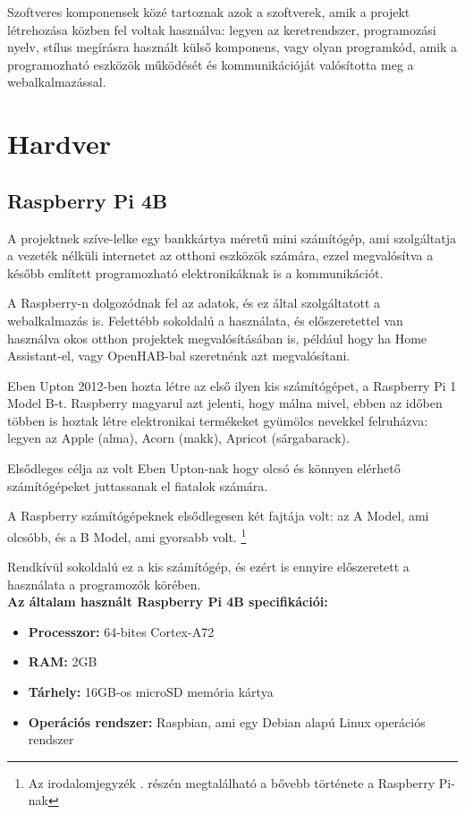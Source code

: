 \documentclass[
]{thesis-ekf}
\theoremstyle{definition}
\theoremstyle{remark}
\begin{document}
	Szoftveres komponensek közé tartoznak azok a szoftverek, amik a projekt létrehozása közben fel voltak használva: legyen az keretrendszer, programozási nyelv, stílus megírásra használt külső komponens, vagy olyan programkód, amik a programozható eszközök működését és kommunikációját valósította meg a webalkalmazással.
	
	\section{Hardver}
	\subsection{Raspberry Pi 4B}
	A projektnek szíve-lelke egy bankkártya méretű mini számítógép, ami szolgáltatja a vezeték nélküli internetet az otthoni eszközök számára, ezzel megvalósítva a később említett programozható elektronikáknak is a kommunikációt.
	
	A Raspberry-n dolgozódnak fel az adatok, és ez által szolgáltatott a webalkalmazás is. Felettébb sokoldalú a használata, és előszeretettel van használva okos otthon projektek megvalósításában is, például hogy ha Home Assistant-el, vagy OpenHAB-bal szeretnénk azt megvalósítani.
	
	Eben Upton 2012-ben hozta létre az első ilyen kis számítógépet, a Raspberry Pi 1 Model B-t. Raspberry magyarul azt jelenti, hogy málna mivel, ebben az időben többen is hoztak létre elektronikai termékeket gyümölcs nevekkel felruházva: legyen az Apple (alma), Acorn (makk), Apricot (sárgabarack).
	
	Elsődleges célja az volt Eben Upton-nak hogy olcsó és könnyen elérhető számítógépeket juttassanak el fiatalok számára.
	
	A Raspberry számítógépeknek elsődlegesen két fajtája volt: az A Model, ami olcsóbb, és a B Model, ami gyorsabb volt. \footnote{Az irodalomjegyzék \cite{raspberrypi-history}. részén megtalálható a bővebb története a Raspberry Pi-nak}
	
	Rendkívül sokoldalú ez a kis számítógép, és ezért is ennyire előszeretett a használata a programozók körében.\\
	\textbf{Az általam használt Raspberry Pi 4B specifikációi:}
	\begin{itemize}
		\item \textbf{Processzor:} 64-bites Cortex-A72
		\item \textbf{RAM:} 2GB
		\item \textbf{Tárhely:} 16GB-os microSD memória kártya
		\item \textbf{Operációs rendszer:} Raspbian, ami egy Debian alapú Linux operációs rendszer
	\end{itemize}
	
\end{document}
